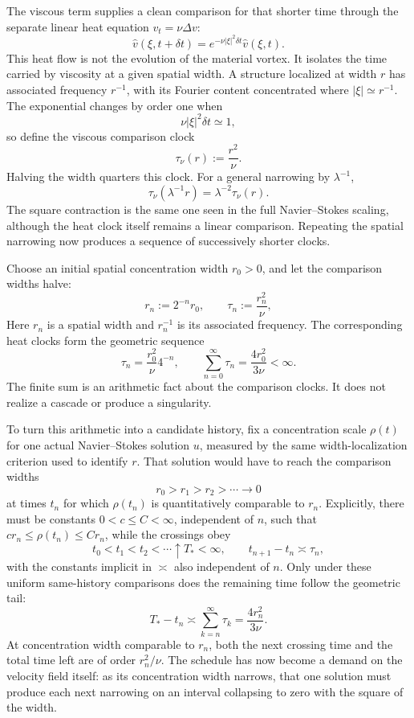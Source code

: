 
The viscous term supplies a clean comparison for that shorter time through the separate linear heat equation \(v_t=\nu\Delta v\):
\[
  \widehat v(\xi,t+\delta t)
  =
  e^{-\nu|\xi|^2\delta t}\widehat v(\xi,t).
\]
This heat flow is not the evolution of the material vortex. It isolates the time carried by viscosity at a given spatial width. A structure localized at width \(r\) has associated frequency \(r^{-1}\), with its Fourier content concentrated where \(|\xi|\simeq r^{-1}\). The exponential changes by order one when
\[
  \nu|\xi|^2\delta t\simeq1,
\]
so define the viscous comparison clock
\[
  \tau_\nu(r)
  :=
  \frac{r^2}{\nu}.
\]
Halving the width quarters this clock. For a general narrowing by \(\lambda^{-1}\),
\[
  \tau_\nu(\lambda^{-1}r)
  =
  \lambda^{-2}\tau_\nu(r).
\]
The square contraction is the same one seen in the full Navier--Stokes scaling, although the heat clock itself remains a linear comparison. Repeating the spatial narrowing now produces a sequence of successively shorter clocks.


Choose an initial spatial concentration width \(r_0>0\), and let the comparison widths halve:
\[
  r_n:=2^{-n}r_0,
  \qquad
  \tau_n:=\frac{r_n^2}{\nu},
\]
Here \(r_n\) is a spatial width and \(r_n^{-1}\) is its associated frequency. The corresponding heat clocks form the geometric sequence
\[
  \tau_n
  =
  \frac{r_0^2}{\nu}4^{-n},
  \qquad
  \sum_{n=0}^{\infty}\tau_n
  =
  \frac{4r_0^2}{3\nu}
  <
  \infty.
\]
The finite sum is an arithmetic fact about the comparison clocks. It does not realize a cascade or produce a singularity.

To turn this arithmetic into a candidate history, fix a concentration scale \(\rho(t)\) for one actual Navier--Stokes solution \(u\), measured by the same width-localization criterion used to identify \(r\). That solution would have to reach the comparison widths
\[
  r_0>r_1>r_2>\cdots\longrightarrow0
\]
at times \(t_n\) for which \(\rho(t_n)\) is quantitatively comparable to \(r_n\). Explicitly, there must be constants \(0<c\leq C<\infty\), independent of \(n\), such that \(c r_n\leq\rho(t_n)\leq C r_n\), while the crossings obey
\[
  t_0<t_1<t_2<\cdots\uparrow T_*<\infty,
  \qquad
  t_{n+1}-t_n\asymp\tau_n,
\]
with the constants implicit in \(\asymp\) also independent of \(n\). Only under these uniform same-history comparisons does the remaining time follow the geometric tail:
\[
  T_*-t_n
  \asymp
  \sum_{k=n}^{\infty}\tau_k
  =
  \frac{4r_n^2}{3\nu}.
\]
At concentration width comparable to \(r_n\), both the next crossing time and the total time left are of order \(r_n^2/\nu\). The schedule has now become a demand on the velocity field itself: as its concentration width narrows, that one solution must produce each next narrowing on an interval collapsing to zero with the square of the width.
